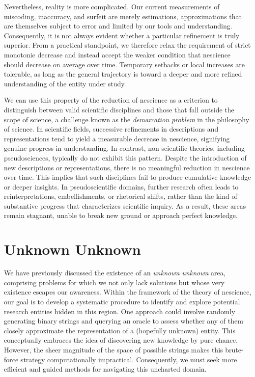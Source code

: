 Nevertheless, reality is more complicated. Our current measurements of miscoding, inaccuracy, and surfeit are merely estimations, approximations that are themselves subject to error and limited by our tools and understanding. Consequently, it is not always evident whether a particular refinement is truly superior. From a practical standpoint, we therefore relax the requirement of strict monotonic decrease and instead accept the weaker condition that nescience should decrease on average over time. Temporary setbacks or local increases are tolerable, as long as the general trajectory is toward a deeper and more refined understanding of the entity under study.

We can use this property of the reduction of nescience as a criterion to distinguish between valid scientific disciplines and those that fall outside the scope of science, a challenge known as the \emph{demarcation problem} in the philosophy of science. In scientific fields, successive refinements in descriptions and representations tend to yield a measurable decrease in nescience, signifying genuine progress in understanding. In contrast, non-scientific theories, including pseudosciences, typically do not exhibit this pattern. Despite the introduction of new descriptions or representations, there is no meaningful reduction in nescience over time. This implies that such disciplines fail to produce cumulative knowledge or deeper insights. In pseudoscientific domains, further research often leads to reinterpretations, embellishments, or rhetorical shifts, rather than the kind of substantive progress that characterizes scientific inquiry. As a result, these areas remain stagnant, unable to break new ground or approach perfect knowledge.

%
%

\section{Unknown Unknown}
\label{sec:intro_unknown_unknown}

We have previously discussed the existence of an \emph{unknown unknown} area, comprising problems for which we not only lack solutions but whose very existence escapes our awareness. Within the framework of the theory of nescience, our goal is to develop a systematic procedure to identify and explore potential research entities hidden in this region. One approach could involve randomly generating binary strings and querying an oracle to assess whether any of them closely approximate the representation of a (hopefully unknown) entity. This conceptually embraces the idea of discovering new knowledge by pure chance. However, the sheer magnitude of the space of possible strings makes this brute-force strategy computationally impractical. Consequently, we must seek more efficient and guided methods for navigating this uncharted domain.

